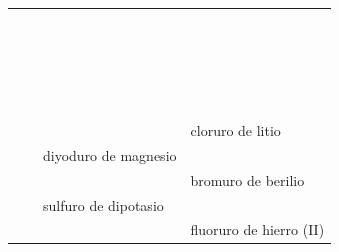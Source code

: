 \begin{landscape}
\begin{longtable}{@{}c C{2cm} C{12cm} C{12cm}@{}}
            \myorder{} &  &  & \rojo{} \\[3pt]
            \myorder{} &  &  & \rojo{} \\[3pt]
            \myorder{} &  &  & \rojo{} \\[3pt]
            \myorder{} &  &  & \rojo{} \\[3pt]
            \myorder{} &  &  & \rojo{} \\[3pt]
            \myorder{} &  &  & \rojo{} \\[3pt]
            \myorder{} &  &  & \rojo{} \\[3pt]
            \myorder{} &  &  & \rojo{} \\[3pt]
            \myorder{} &  &  & \rojo{} \\[3pt]
            \myorder{} &  &  & \rojo{} \\[3pt]
            \myorder{} &  &  & \rojo{} \\[3pt]
            \myorder{} &  &  & \rojo{} \\[3pt]
            \myorder{} &  &  & \rojo{} \\[3pt]
            \myorder{} &  &  & \rojo{} \\[3pt]
            \myorder{} &  &  & \rojo{} \\[3pt]
            \myorder{} &  & \rojo{} &  \\[3pt]
            \myorder{} &  &  & \rojo{} \\[3pt]
            \myorder{} &  &  & \rojo{} \\[3pt]
            \myorder{} &  &  &  \\[3pt]
            \myorder{} &  &  & \rojo{} \\[3pt]
            \myorder{} &  &  & \rojo{} \\[3pt]
            \myorder{} & \rojo{\ch{}} &  & cloruro de litio \\[3pt]
            \myorder{} & \rojo{\ch{}} & diyoduro de magnesio & \rojo{} \\[3pt]
            \myorder{} & \rojo{\ch{}} & \rojo{} & bromuro de berilio \\[3pt]
            \myorder{} & \rojo{\ch{}} & sulfuro de dipotasio & \rojo{} \\[3pt]
            \myorder{} & \rojo{\ch{}} & \rojo{} & fluoruro de hierro (II) \\[3pt]

\end{longtable}
\end{landscape}
